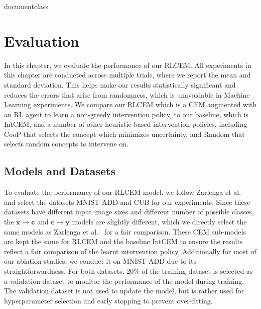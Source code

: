 \csname documentclass

\chapter{Evaluation}

In this chapter, we evaluate the performance of our RLCEM. All experiments in this chapter
are conducted across multiple trials, where we report the mean
and standard deviation. This helps make our results statistically significant and reduces the errors
that arise from randomness, which is unavoidable in Machine
Learning experiments.
We compare our RLCEM which is a CEM augmented with an RL agent to learn 
a non-greedy intervention policy, to our baseline, which is IntCEM, and a number of other
heuristic-based intervention policies, 
including CooP that selects the 
concept which minimizes uncertainty, and Random that selects
random concepts to intervene on.

\section{Models and Datasets}\label{method:datasets}
To evaluate the performance of our RLCEM model,
we follow Zarlenga et al.~\cite{intcem} and select the datasets MNIST-ADD and CUB for 
our experiments. Since these datasets have different input image sizes
and different number of possible classes,
the $\mathbf{x} \to \mathbf{c}$ and $\mathbf{c} \to \mathbf{y}$ models 
are slightly different, which we directly select the same 
models as Zarlenga et al.~\cite{intcem}
for a fair comparison. These CEM sub-models are kept the same
for RLCEM and the baseline IntCEM to ensure the results reflect a fair comparison 
of the learnt intervention policy.
Additionally for most of our ablation studies,
we conduct it on MNIST-ADD due to its straightforwardness.
For both datasets, 20\% of the training dataset is selected
as a validation dataset to monitor
the performance of the model during training. The validation dataset
is not used to update the model, but is rather used for 
hyperparameter selection and early stopping to prevent over-fitting.

